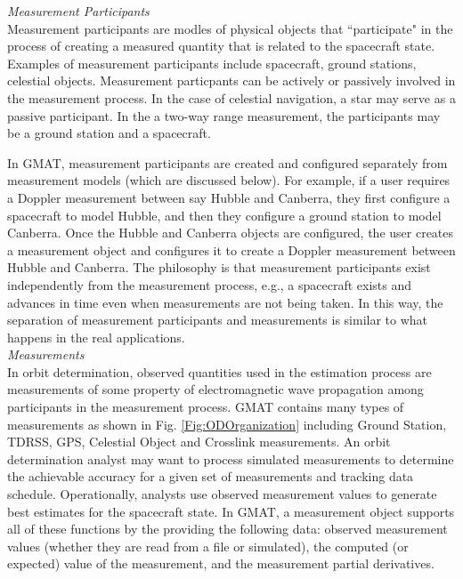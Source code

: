 

\textit{Measurement Participants}\\

Measurement participants are modles of physical objects that
``participate" in the process of creating a measured quantity that
is related to the spacecraft state.  Examples of measurement
participants include spacecraft, ground stations, celestial objects.
Measurement particpants can be actively or passively involved in the
measurement process. In the case of celestial navigation, a star may
serve as a passive participant.  In the a two-way range measurement,
the participants may be a ground station and a spacecraft.

In GMAT, measurement participants are created and configured
separately from measurement models (which are discussed below).  For
example, if a user requires a Doppler measurement between say Hubble
and Canberra, they first configure a spacecraft to model Hubble, and
then they configure a ground station to model Canberra. Once the
Hubble and Canberra objects are configured, the user creates a
measurement object and configures it to create a Doppler measurement
between Hubble and Canberra.  The philosophy is that measurement
participants exist independently from the measurement process, e.g.,
a spacecraft exists and advances in time even when measurements are
not being taken.  In this way, the separation of measurement
participants and measurements is similar to what happens in the real
applications.\\

\textit{Measurements}\\

In orbit determination, observed quantities used in the estimation
process are measurements of some property of electromagnetic wave
propagation among participants in the measurement process.
\cite{GTDS:89}  GMAT contains many types of measurements as shown in
Fig. \ref{Fig:ODOrganization} including Ground Station, TDRSS, GPS,
Celestial Object and Crosslink measurements.  An orbit determination
analyst may want to process simulated measurements to determine the
achievable accuracy for a given set of measurements and tracking
data schedule.  Operationally, analysts use observed measurement
values to generate best estimates for the spacecraft state. In GMAT,
a measurement object supports all of these functions by the
providing the following data:  observed measurement values (whether
they are read from a file or simulated), the computed (or expected)
value of the measurement, and the measurement partial derivatives.

